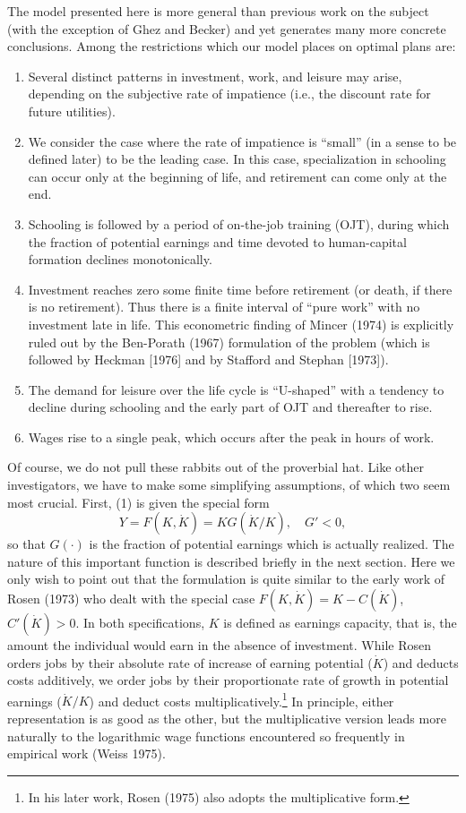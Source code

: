 \documentclass[11pt,fleqn]{article}
\begin{document}
The model presented here is more general than previous work on the subject (with the exception of Ghez and Becker) and yet generates many more concrete conclusions. Among the restrictions which our model places on optimal plans are:
\begin{enumerate}
    \item[(a)] Several distinct patterns in investment, work, and leisure may arise, depending on the subjective rate of impatience (i.e., the discount rate for future utilities).
    \item[(b)] We consider the case where the rate of impatience is ``small'' (in a sense to be defined later) to be the leading case. In this case, specialization in schooling can occur only at the beginning of life, and retirement can come only at the end.
    \item[(c)] Schooling is followed by a period of on-the-job training (OJT), during which the fraction of potential earnings and time devoted to human-capital formation declines monotonically.
    \item[(d)] Investment reaches zero some finite time before retirement (or death, if there is no retirement). Thus there is a finite interval of ``pure work'' with no investment late in life. This econometric finding of Mincer (1974) is explicitly ruled out by the Ben-Porath (1967) formulation of the problem (which is followed by Heckman [1976] and by Stafford and Stephan [1973]).
    \item[(e)] The demand for leisure over the life cycle is ``U-shaped'' with a tendency to decline during schooling and the early part of OJT and thereafter to rise.
    \item[(f)] Wages rise to a single peak, which occurs after the peak in hours of work.
\end{enumerate}

Of course, we do not pull these rabbits out of the proverbial hat. Like other investigators, we have to make some simplifying assumptions, of which two seem most crucial. First, (1) is given the special form
\begin{equation}
Y = F(K, \dot{K}) = K G(\dot{K}/K), \quad G' < 0,
\end{equation}
so that $G(\cdot)$ is the fraction of potential earnings which is actually realized. The nature of this important function is described briefly in the next section. Here we only wish to point out that the formulation is quite similar to the early work of Rosen (1973) who dealt with the special case $F(K, \dot{K}) = K - C(\dot{K})$, $C'(\dot{K}) > 0$. In both specifications, $K$ is defined as earnings capacity, that is, the amount the individual would earn in the absence of investment. While Rosen orders jobs by their absolute rate of increase of earning potential ($\dot{K}$) and deducts costs additively, we order jobs by their proportionate rate of growth in potential earnings ($\dot{K}/K$) and deduct costs multiplicatively.\footnote{In his later work, Rosen (1975) also adopts the multiplicative form.} In principle, either representation is as good as the other, but the multiplicative version leads more naturally to the logarithmic wage functions encountered so frequently in empirical work (Weiss 1975).
\end{document}
